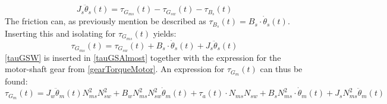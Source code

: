 \begin{equation}
J_s\ddot\theta_s(t) = \tau_{G_{ms}}(t) - \tau_{G_{sw}}(t) - \tau_{B_s}(t) \nonumber
\end{equation}
The friction can, as previously mention be described as $\tau_{B_s}(t) = B_s \cdot \dot\theta_s(t)$. Inserting this and isolating for $\tau_{G_{ms}}(t)$ yields:
\begin{equation}
\tau_{G_{ms}}(t) = \tau_{G_{sw}}(t) + B_s \cdot \dot\theta_s(t) + J_s\ddot\theta_s(t) 
\label{tauGSAlmost}
\end{equation}
\autoref{tauGSW} is inserted in \autoref{tauGSAlmost} together with the expression for the motor-shaft gear from \autoref{gearTorqueMotor}. An expression for $\tau_{G_m}(t)$ can thus be found:
\begin{equation}
\tau_{G_{m}}(t) = J_w \ddot\theta_m(t) N_{ms}^2 N_{sw}^2 + B_w N_{ms}^2 N_{sw}^2\dot\theta_m(t) + \tau_a(t)\cdot N_{ms} N_{sw} + B_s N_{ms}^2 \cdot \dot\theta_m(t) + J_s N_{ms}^2 \ddot\theta_m(t) 
\label{tauGM}
\end{equation}


